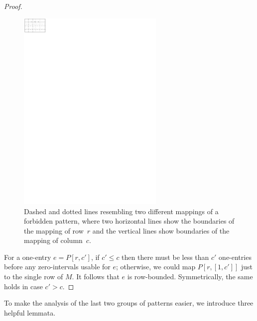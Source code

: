 \begin{proof}
\begin{figure}[!ht]
\centering
\includegraphics[width=70mm]{img/twolines.pdf}
\caption{Dashed and dotted lines resembling two different mappings of a forbidden pattern, where two horizontal lines show the boundaries of the mapping of row~$r$ and the vertical lines show boundaries of the mapping of column~$c$.}
\label{twolines}
\end{figure}

For a one-entry $e=P[r,c']$, if $c'\leq c$ then there must be less than $c'$ one-entries before any zero-intervals usable for $e$; otherwise, we could map $P[r,[1,c']]$ just to the single row of $M$. It follows that $e$ is row-bounded. Symmetrically, the same holds in case $c'>c$. 
\end{proof}

To make the analysis of the last two groups of patterns easier, we introduce three helpful lemmata.

